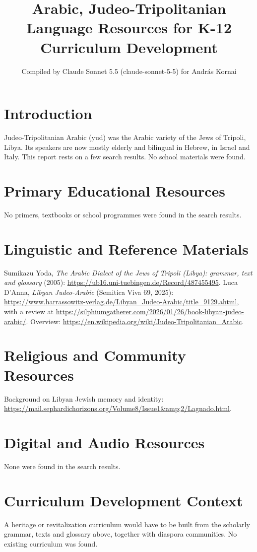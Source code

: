 \documentclass[12pt]{article}
\title{Arabic, Judeo-Tripolitanian Language Resources for K-12 Curriculum Development}
\author{Compiled by Claude Sonnet 5.5 (claude-sonnet-5-5) for Andr\'as Kornai}
\date{}
\begin{document}
\maketitle

\section{Introduction}
Judeo-Tripolitanian Arabic (yud) was the Arabic variety of the Jews of Tripoli, Libya. Its speakers are now mostly elderly and bilingual in Hebrew, in Israel and Italy. This report rests on a few search results. No school materials were found.

\section{Primary Educational Resources}
No primers, textbooks or school programmes were found in the search results.

\section{Linguistic and Reference Materials}
Sumikazu Yoda, \emph{The Arabic Dialect of the Jews of Tripoli (Libya): grammar, text and glossary} (2005): \url{https://ub16.uni-tuebingen.de/Record/487455495}.
Luca D'Anna, \emph{Libyan Judeo-Arabic} (Semitica Viva 69, 2025): \url{https://www.harrassowitz-verlag.de/Libyan_Judeo-Arabic/title_9129.ahtml}, with a review at \url{https://silphiumgatherer.com/2026/01/26/book-libyan-judeo-arabic/}.
Overview: \url{https://en.wikipedia.org/wiki/Judeo-Tripolitanian_Arabic}.

\section{Religious and Community Resources}
Background on Libyan Jewish memory and identity: \url{https://mail.sephardichorizons.org/Volume8/Issue1&amp;2/Lagnado.html}.

\section{Digital and Audio Resources}
None were found in the search results.

\section{Curriculum Development Context}
A heritage or revitalization curriculum would have to be built from the scholarly grammar, texts and glossary above, together with diaspora communities. No existing curriculum was found.
\end{document}
